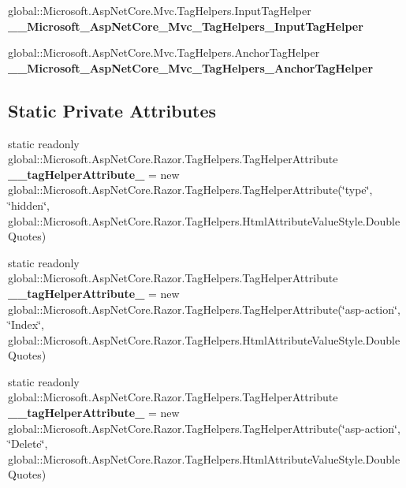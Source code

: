 \begin{DoxyCompactItemize}
\item 
\mbox{\label{class_asp_net_core_1_1_views___items___delete_a7ea52cfc0ac3c86961e5caafcc578ba9}} 
global\+::\+Microsoft.\+Asp\+Net\+Core.\+Mvc.\+Tag\+Helpers.\+Input\+Tag\+Helper {\bfseries \+\_\+\+\_\+\+Microsoft\+\_\+\+Asp\+Net\+Core\+\_\+\+Mvc\+\_\+\+Tag\+Helpers\+\_\+\+Input\+Tag\+Helper}
\item 
\mbox{\label{class_asp_net_core_1_1_views___items___delete_a52e2a5fede80c0457a1fdc24f6b2931c}} 
global\+::\+Microsoft.\+Asp\+Net\+Core.\+Mvc.\+Tag\+Helpers.\+Anchor\+Tag\+Helper {\bfseries \+\_\+\+\_\+\+Microsoft\+\_\+\+Asp\+Net\+Core\+\_\+\+Mvc\+\_\+\+Tag\+Helpers\+\_\+\+Anchor\+Tag\+Helper}
\end{DoxyCompactItemize}
\subsection*{Static Private Attributes}
\begin{DoxyCompactItemize}
\item 
\mbox{\label{class_asp_net_core_1_1_views___items___delete_a0f447acc8205a9512b5f5c31a5d11e3b}} 
static readonly global\+::\+Microsoft.\+Asp\+Net\+Core.\+Razor.\+Tag\+Helpers.\+Tag\+Helper\+Attribute {\bfseries \+\_\+\+\_\+tag\+Helper\+Attribute\+\_} = new global\+::\+Microsoft.\+Asp\+Net\+Core.\+Razor.\+Tag\+Helpers.\+Tag\+Helper\+Attribute(\char`\"{}type\char`\"{}, \char`\"{}hidden\char`\"{}, global\+::\+Microsoft.\+Asp\+Net\+Core.\+Razor.\+Tag\+Helpers.\+Html\+Attribute\+Value\+Style.\+Double\+Quotes)
\item 
\mbox{\label{class_asp_net_core_1_1_views___items___delete_a64fee3c76227d1da4cec60ab043e0de9}} 
static readonly global\+::\+Microsoft.\+Asp\+Net\+Core.\+Razor.\+Tag\+Helpers.\+Tag\+Helper\+Attribute {\bfseries \+\_\+\+\_\+tag\+Helper\+Attribute\+\_} = new global\+::\+Microsoft.\+Asp\+Net\+Core.\+Razor.\+Tag\+Helpers.\+Tag\+Helper\+Attribute(\char`\"{}asp-\/action\char`\"{}, \char`\"{}Index\char`\"{}, global\+::\+Microsoft.\+Asp\+Net\+Core.\+Razor.\+Tag\+Helpers.\+Html\+Attribute\+Value\+Style.\+Double\+Quotes)
\item 
\mbox{\label{class_asp_net_core_1_1_views___items___delete_af245b8ff6255135cbeafb4046b83940d}} 
static readonly global\+::\+Microsoft.\+Asp\+Net\+Core.\+Razor.\+Tag\+Helpers.\+Tag\+Helper\+Attribute {\bfseries \+\_\+\+\_\+tag\+Helper\+Attribute\+\_} = new global\+::\+Microsoft.\+Asp\+Net\+Core.\+Razor.\+Tag\+Helpers.\+Tag\+Helper\+Attribute(\char`\"{}asp-\/action\char`\"{}, \char`\"{}Delete\char`\"{}, global\+::\+Microsoft.\+Asp\+Net\+Core.\+Razor.\+Tag\+Helpers.\+Html\+Attribute\+Value\+Style.\+Double\+Quotes)
\end{DoxyCompactItemize}


